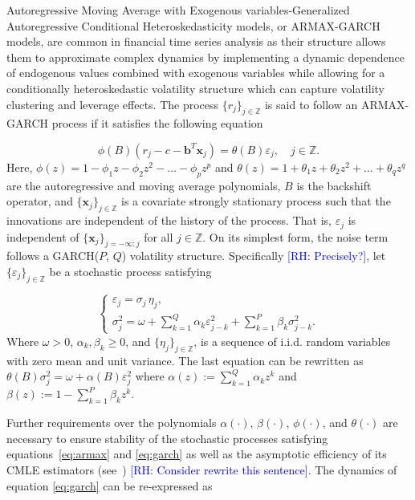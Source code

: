 \documentclass[10pt,a4paper,oneside]{article}
\newcommand{\Z}{\mathbb{Z}}
\newcommand{\rh}[1]{\textcolor{blue}{\textsf{[RH: #1]}}}
\begin{document}
Autoregressive Moving Average with Exogenous variables-Generalized Autoregressive Conditional Heteroskedasticity models, or ARMAX-GARCH models, are common in financial time series analysis as their structure allows them to approximate complex dynamics by implementing a dynamic dependence of endogenous values combined with exogenous variables while allowing for a conditionally heteroskedastic volatility structure which can capture volatility clustering and leverage effects. The process $\{r_j\}_{j \in \Z}$ is said to follow an ARMAX-GARCH process if it satisfies the following equation

\begin{equation}
    \phi(B) \left( r_j - c - \mathbf{b}^T \mathbf{x}_j \right) = \theta(B) \varepsilon_j, \quad j \in \Z.
    \label{eq:armax}
\end{equation}
Here, $\phi(z) = 1 - \phi_1 z - \phi_2 z^2 - \dots - \phi_p z^p$ and $\theta(z) = 1 + \theta_1 z + \theta_2 z^2 + \dots + \theta_q z^q$ are the autoregressive and moving average polynomials, $B$ is the backshift operator, and $\{ \mathbf{x}_j \}_{j \in \Z}$ is a covariate strongly stationary process such that the innovations are independent of the history of the process. That is, $\varepsilon_j$ is independent of $\{ \mathbf{x}_j \}_{j = - \infty : j}$ for all $j \in \Z$. On its simplest form, the noise term follows a GARCH($P$, $Q$) volatility structure. Specifically \rh{Precisely?}, let $\{ \varepsilon_j \}_{j \in \Z}$ be a stochastic process satisfying

\begin{equation}
    \begin{cases}
        \varepsilon_j = \sigma_j \,\eta_j, \\[6pt]
        \sigma_j^2 = \omega + \sum^{Q}_{k = 1} \alpha_k \varepsilon^2_{j - k} + \sum^P_{k = 1} \beta_k \sigma_{j - k}^2.
    \end{cases}
    \label{eq:garch}
\end{equation}
Where $\omega > 0$, $\alpha_k, \beta_k \geq 0$, and $\{ \eta_j\}_{j \in \Z}$, is a sequence of i.i.d. random variables with zero mean and unit variance. The last equation can be rewritten as $\theta(B) \sigma^2_j = \omega + \alpha(B) \varepsilon^2_j$ where $\alpha(z) := \sum^Q_{k = 1} \alpha_k z^k$ and $\beta(z) := 1 - \sum^P_{k = 1} \beta_k z^k$.

Further requirements over the polynomials $\alpha(\cdot)$, $\beta(\cdot)$, $\phi(\cdot)$, and $\theta(\cdot)$ are necessary to ensure stability of the stochastic processes satisfying equations~\eqref{eq:armax} and \eqref{eq:garch} as well as the asymptotic efficiency of its CMLE estimators (see~\cite{mejia2025asymptotic}) \rh{Consider rewrite this sentence}. The dynamics of equation \eqref{eq:garch} can be re-expressed as
\end{document}
